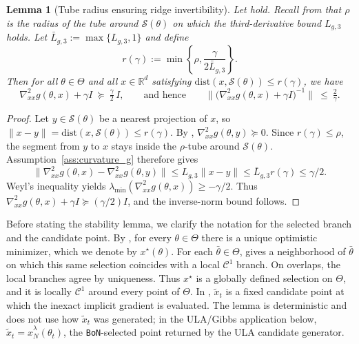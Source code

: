 \documentclass{article}
\theoremstyle{normaltheorem}
\newtheorem{lemma}[lemma]{Lemma}
\newcommand{\R}{\mathbb{R}}
\newcommand{\calS}{\mathcal{S}}
\newcommand{\BoN}{\texttt{BoN}\xspace}
\begin{document}
\begin{lemma}[Tube radius ensuring ridge invertibility]\label{lem:tube-invertibility}
Let  hold.
Recall from  that \(\rho\) is the radius of the tube around \(\calS(\theta)\) on which the
third-derivative bound \(L_{g,3}\) holds. Let \(\bar L_{g,3}:=\max\{L_{g,3},1\}\) and define
\[
r(\gamma):=\min\left\{\rho,\frac{\gamma}{2\bar L_{g,3}}\right\}.
\]
Then for all $\theta\in\Theta$ and all
$x\in\R^d$ satisfying $\mathrm{dist}(x,\calS(\theta))\le r(\gamma)$, we have
\[
\nabla^2_{xx}g(\theta,x)+\gamma I \ \succeq\ \tfrac{\gamma}{2}\,I,
\qquad\text{and hence}\qquad
\big\|\big(\nabla^2_{xx}g(\theta,x)+\gamma I\big)^{-1}\big\|\ \le\ \tfrac{2}{\gamma}.
\]
\end{lemma}
\begin{proof}
Let \(y\in\calS(\theta)\) be a nearest projection of \(x\), so \(\|x-y\|=\mathrm{dist}(x,\calS(\theta))\le r(\gamma)\).
By , \(\nabla^2_{xx}g(\theta,y)\succeq 0\).
Since \(r(\gamma)\le\rho\), the segment from \(y\) to \(x\) stays inside the \(\rho\)-tube around \(\calS(\theta)\).
Assumption~\ref{ass:curvature_g} therefore gives
\[
\|\nabla^2_{xx}g(\theta,x)-\nabla^2_{xx}g(\theta,y)\|
\le L_{g,3}\|x-y\|
\le \bar L_{g,3}r(\gamma)
\le \gamma/2.
\]
Weyl's inequality yields \(\lambda_{\min}(\nabla^2_{xx}g(\theta,x))\ge-\gamma/2\).
Thus \(\nabla^2_{xx}g(\theta,x)+\gamma I\succeq(\gamma/2)I\), and the inverse-norm bound follows.
\end{proof}

Before stating the stability lemma, we clarify the notation for the selected branch and the candidate point. By , for every
\(\theta\in\Theta\) there is a unique optimistic minimizer, which we denote by \(x^\star(\theta)\). For each
\(\bar\theta\in\Theta\),  gives a neighborhood of \(\bar\theta\) on which this same selection
coincides with a local \(\mathcal{C}^{1}\) branch. On overlaps, the local branches agree by uniqueness. Thus \(x^\star\) is a
globally defined selection on \(\Theta\), and it is locally \(\mathcal{C}^{1}\) around every point of \(\Theta\).
In , \(\tilde x_t\) is a fixed candidate point at which the inexact implicit gradient is evaluated.
The lemma is deterministic and does not use how \(\tilde x_t\) was generated; in the ULA/Gibbs application below,
\(\tilde x_t=\hat x_N^\lambda(\theta_t)\), the \BoN-selected point returned by the ULA candidate generator.
\end{document}
